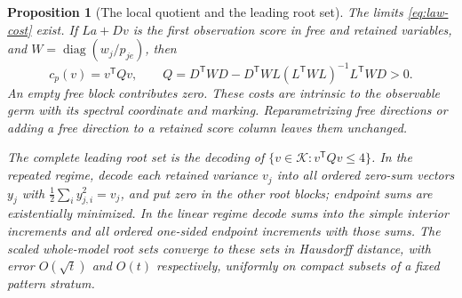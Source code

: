 \documentclass[11pt,reqno]{amsart}
\numberwithin{equation}{section}
\newtheorem{proposition}[theorem]{Proposition}
\theoremstyle{definition}
\theoremstyle{remark}
\newcommand{\cK}{\mathcal K}
\begin{document}
\begin{proposition}[The local quotient and the leading root set]\label{prop:local}
The limits \eqref{eq:law-cost} exist. If $La+Dv$ is the first observation score in free and retained variables, and $W=\operatorname{diag}(w_j/p_{je})$, then
\begin{equation}\label{eq:Q}
 c_p(v)=v^{\mathsf T}Qv,\qquad
 Q=D^{\mathsf T}WD-D^{\mathsf T}WL(L^{\mathsf T}WL)^{-1}L^{\mathsf T}WD>0.
\end{equation}
An empty free block contributes zero. These costs are intrinsic to the observable germ with its spectral coordinate and marking. Reparametrizing free directions or adding a free direction to a retained score column leaves them unchanged.

The complete leading root set is the decoding of $\{v\in\cK:v^{\mathsf T}Qv\le4\}$. In the repeated regime, decode each retained variance $v_j$ into all ordered zero-sum vectors $y_j$ with $\frac12\sum_i y_{j,i}^2=v_j$, and put zero in the other root blocks; endpoint sums are existentially minimized. In the linear regime decode sums into the simple interior increments and all ordered one-sided endpoint increments with those sums. The scaled whole-model root sets converge to these sets in Hausdorff distance, with error $O(\sqrt t)$ and $O(t)$ respectively, uniformly on compact subsets of a fixed pattern stratum.
\end{proposition}
\end{document}
